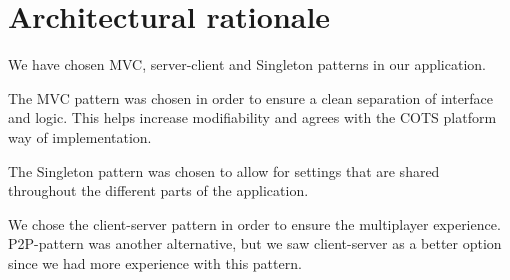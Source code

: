 \section{Architectural rationale}
\label{sec:architecturalrationale}

We have chosen MVC, server-client and Singleton patterns in our application.

The MVC pattern was chosen in order to ensure a clean separation of interface and logic. This helps increase modifiability and agrees with the COTS platform way of implementation.

The Singleton pattern was chosen to allow for settings that are shared throughout the different parts of the application.

We chose the client-server pattern in order to ensure the multiplayer experience. P2P-pattern was another alternative, but we saw client-server as a better option since we had more experience with this pattern.
